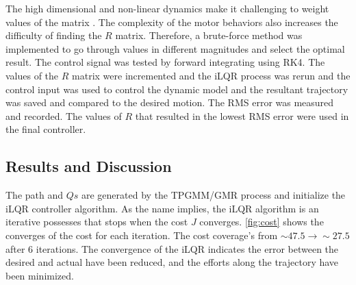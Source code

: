 The high dimensional and non-linear dynamics make it challenging to weight values of the matrix \cite{park2012multi}. The complexity of the motor behaviors also increases the difficulty of finding the $R$ matrix. Therefore, a brute-force method was implemented to go through values in different magnitudes and select the optimal result. The control signal was tested by forward integrating using RK4. The values of the $R$ matrix were incremented and the iLQR process was rerun and the control input was used to control the dynamic model and the resultant trajectory was saved and compared to the desired motion. The RMS error was measured and recorded. The values of $R$ that resulted in the lowest RMS error were used in the final controller. 



\subsection{Results and Discussion}



The path and $Qs$ are generated by the TPGMM/GMR process and initialize the iLQR controller algorithm. As the name implies, the iLQR algorithm is an iterative possesses that stops when the cost $J$ converges.  \autoref{fig:cost} shows the converges of the cost for each iteration. The cost coverage's from $\sim47.5 \rightarrow \sim27.5$ after 6 iterations. The convergence of the iLQR indicates the error between the desired and actual have been reduced, and the efforts along the trajectory have been minimized. 

 

